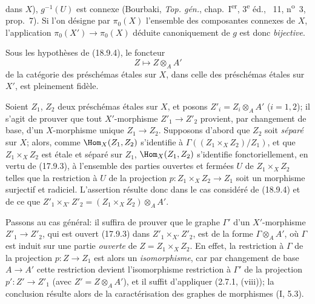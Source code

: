 
dans $X$), $g^{-1}(U)$ est connexe (Bourbaki, \emph{Top. gén.}, chap.~I\textsuperscript{er}, 3\textsuperscript{e} éd., \textsection~11, n\textsuperscript{o}~3, prop.~7). Si l'on désigne par $\pi_0(X)$ l'ensemble des composantes connexes de $X$, l'application $\pi_0(X')\to\pi_0(X)$ déduite canoniquement de $g$ est donc \emph{bijective}.

\begin{corollary}[18.9.5]
\label{IV.18.9.5}
Sous les hypothèses de (18.9.4), le foncteur
\begin{equation}
  Z\longmapsto Z\otimes_A A'
  \tag{18.9.5.1}
  \label{IV.18.9.5.1}
\end{equation}
de la catégorie des préschémas étales sur $X$, dans celle des préschémas étales sur $X'$, est pleinement fidèle.
\end{corollary}

Soient $Z_1$, $Z_2$ deux préschémas étales sur $X$, et posons $Z'_i=Z_i\otimes_A A'$ ($i=1,2$); il s'agit de prouver que tout $X'$-morphisme $Z'_1\to Z'_2$ provient, par changement de base, d'un $X$-morphisme unique $Z_1\to Z_2$. Supposons d'abord que $Z_2$ soit \emph{séparé} sur $X$; alors, comme $\Hom_X(Z_1,Z_2)$ s'identifie à $\Gamma((Z_1\times_X Z_2)/Z_1)$, et que $Z_1\times_X Z_2$ est étale et séparé sur $Z_1$, $\Hom_X(Z_1,Z_2)$ s'identifie fonctoriellement, en vertu de (17.9.3), à l'ensemble des parties ouvertes et fermées $U$ de $Z_1\times_X Z_2$ telles que la restriction à $U$ de la projection $p:Z_1\times_X Z_2\to Z_1$ soit un morphisme surjectif et radiciel. L'assertion résulte donc dans le cas considéré de (18.9.4) et de ce que $Z'_1\times_{X'}Z'_2=(Z_1\times_X Z_2)\otimes_A A'$.

Passons au cas général: il suffira de prouver que le graphe $\Gamma'$ d'un $X'$-morphisme $Z'_1\to Z'_2$, qui est ouvert (17.9.3) dans $Z'_1\times_{X'}Z'_2$, est de la forme $\Gamma\otimes_A A'$, où $\Gamma$ est induit sur une partie \emph{ouverte} de $Z=Z_1\times_X Z_2$. En effet, la restriction à $\Gamma$ de la projection $p:Z\to Z_1$ est alors un \emph{isomorphisme}, car par changement de base $A\to A'$ cette restriction devient l'isomorphisme restriction à $\Gamma'$ de la projection $p':Z'\to Z'_1$ (avec $Z'=Z\otimes_A A'$), et il suffit d'appliquer (2.7.1, (viii)); la conclusion résulte alors de la caractérisation des graphes de morphismes (I, 5.3).

